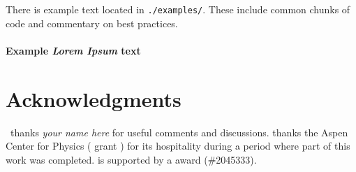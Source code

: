 \documentclass[12pt]{article}
\begin{document}
There is example text located in \texttt{./examples/}. These include common chunks of code and commentary on best practices.


\paragraph{Example \emph{Lorem Ipsum} text} \lipsum[5]


% 
% 
% 



\section*{Acknowledgments}

\ thanks 
\emph{your name here}
for useful comments and discussions. 
%
 thanks 
    the Aspen Center for Physics ( grant )
    for 
    its 
    hospitality during a period where part of this work was completed. 
%
 is supported by a  award (\#2045333).


 
% 

\end{document}
